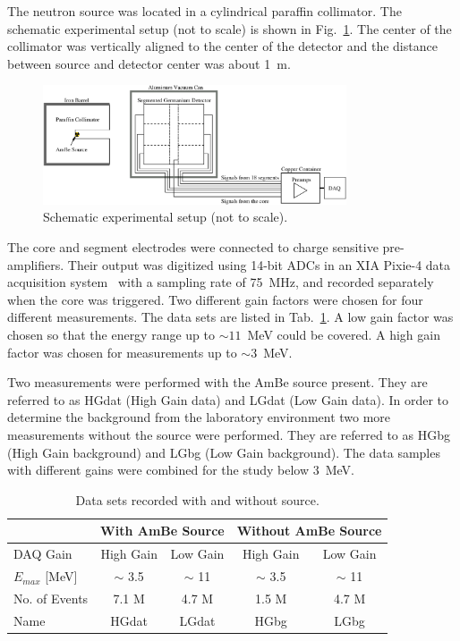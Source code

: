 \documentclass{elsart}
\begin{document}
The neutron source was located in a cylindrical paraffin
collimator. The schematic experimental setup (not to scale) is shown
in Fig.~\ref{fig:exp}. The center of the collimator was vertically
aligned to the center of the detector and the distance between source
and detector center was about 1~m.

\begin{figure}[tbhp]
  \centering
  \includegraphics[width=0.8\textwidth]{expSchema2.eps}
  \caption{Schematic experimental setup (not to scale).}
  \label{fig:exp}
\end{figure}

The core and segment electrodes were connected to charge sensitive
pre-amplifiers. Their output was digitized using 14-bit ADCs in an XIA
Pixie-4 data acquisition system~\cite{daq} with a sampling rate of
75~MHz, and recorded separately when the core was triggered. Two
different gain factors were chosen for four different
measurements. The data sets are listed in Tab.~\ref{tab:datset}. A low
gain factor was chosen so that the energy range up to $\sim 11$~MeV
could be covered. A high gain factor was chosen for measurements up to
$\sim 3$~MeV.

Two measurements were performed with the AmBe source present. They are
referred to as HGdat (High Gain data) and LGdat (Low Gain data). In
order to determine the background from the laboratory environment two
more measurements without the source were performed. They are referred
to as HGbg (High Gain background) and LGbg (Low Gain background). The
data samples with different gains were combined for the study below
3~MeV.

\begin{table}[tbhp]
  \caption{Data sets recorded with and without source.} 
  \label{tab:datset}
  \begin{tabular*}{\textwidth}{@{\extracolsep{\fill}}lcccc}\hline\hline
    & \multicolumn{2}{c}{With AmBe Source} & \multicolumn{2}{c}{Without AmBe Source} \\\hline
    DAQ Gain & High Gain & Low Gain  & High Gain & Low Gain \\
    $E_{max}$ [MeV] & $\sim$ 3.5  & $\sim$ 11 & $\sim$ 3.5 & $\sim$ 11 \\
    No. of Events & 7.1 M & 4.7 M & 1.5 M & 4.7 M \\
    Name & HGdat & LGdat & HGbg & LGbg \\\hline\hline
  \end{tabular*}
\end{table}
\end{document}
